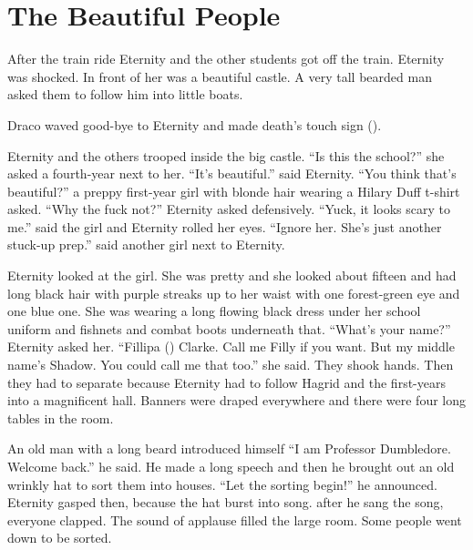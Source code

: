 \section{The Beautiful People}


After the train ride Eternity and the other students got off the train. Eternity was shocked. In front of her was a beautiful castle. A very tall bearded man asked them to follow him into little boats.

Draco waved good-bye to Eternity and made death's touch sign ().

Eternity and the others trooped inside the big castle. \enquote{Is this the school?} she asked a fourth-year next to her. \enquote{It's beautiful.} said Eternity. \enquote{You think that's beautiful?} a preppy first-year girl with blonde hair wearing a Hilary Duff t-shirt asked. \enquote{Why the fuck not?} Eternity asked defensively. \enquote{Yuck, it looks scary to me.} said the girl and Eternity rolled her eyes. \enquote{Ignore her. She's just another stuck-up prep.} said another girl next to Eternity.

Eternity looked at the girl. She was pretty and she looked about fifteen and had long black hair with purple streaks up to her waist with one forest-green eye and one blue one. She was wearing a long flowing black dress under her school uniform and fishnets and combat boots underneath that. \enquote{What's your name?} Eternity asked her. \enquote{Fillipa () Clarke. Call me Filly if you want. But my middle name's Shadow. You could call me that too.} she said. They shook hands. Then they had to separate because Eternity had to follow Hagrid and the first-years into a magnificent hall. Banners were draped everywhere and there were four long tables in the room.

An old man with a long beard introduced himself \enquote{I am Professor Dumbledore. Welcome back.} he said. He made a long speech and then he brought out an old wrinkly hat to sort them into houses. \enquote{Let the sorting begin!} he announced. Eternity gasped then, because the hat burst into song. after he sang the song, everyone clapped. The sound of applause filled the large room. Some people went down to be sorted.

